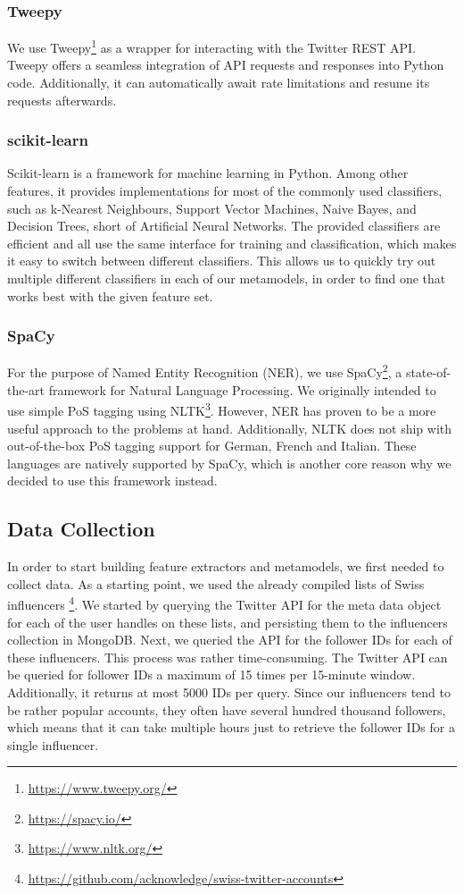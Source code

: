 \documentclass[10pt,a4paper]{article}
\begin{document}
\subsubsection{Tweepy}
We use Tweepy\footnote{\href{https://www.tweepy.org/}{https://www.tweepy.org/}} as a wrapper for interacting with the Twitter REST API. Tweepy offers a seamless integration of API requests and responses into Python code. Additionally, it can automatically await rate limitations and resume its requests afterwards. 

\subsubsection{scikit-learn}
Scikit-learn is a framework for machine learning in Python. Among other features, it provides implementations for most of the commonly used classifiers, such as k-Nearest Neighbours, Support Vector Machines, Naive Bayes, and Decision Trees, short of Artificial Neural Networks. The provided classifiers are efficient and all use the same interface for training and classification, which makes it easy to switch between different classifiers. This allows us to quickly try out multiple different classifiers in each of our metamodels, in order to find one that works best with the given feature set.

\subsubsection{SpaCy}
For the purpose of Named Entity Recognition (NER), we use SpaCy\footnote{\href{https://spacy.io/}{https://spacy.io/}}, a state-of-the-art framework for Natural Language Processing. We originally intended to use simple PoS tagging using NLTK\footnote{\href{https://www.nltk.org/}{https://www.nltk.org/}}. However, NER has proven to be a more useful approach to the problems at hand. Additionally, NLTK does not ship with out-of-the-box PoS tagging support for German, French and Italian. These languages are natively supported by SpaCy, which is another core reason why we decided to use this framework instead.

\subsection{Data Collection}
In order to start building feature extractors and metamodels, we first needed to collect data. As a starting point, we used the already compiled lists of Swiss influencers \footnote{\href{https://github.com/acknowledge/swiss-twitter-accounts}{https://github.com/acknowledge/swiss-twitter-accounts}}. We started by querying the Twitter API for the meta data object for each of the user handles on these lists, and persisting them to the influencers collection in MongoDB. Next, we queried the API for the follower IDs for each of these influencers. This process was rather time-consuming. The Twitter API can be queried for follower IDs a maximum of 15 times per 15-minute window. Additionally, it returns at most 5000 IDs per query. Since our influencers tend to be rather popular accounts, they often have several hundred thousand followers, which means that it can take multiple hours just to retrieve the follower IDs for a single influencer.
\end{document}
